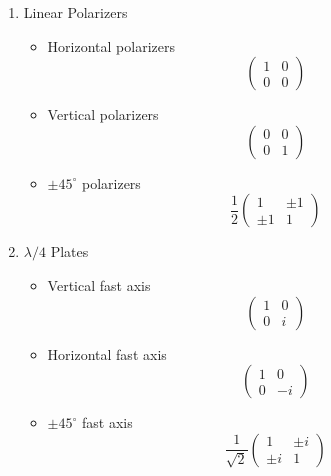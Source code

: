 \documentclass[../electromagnetism.tex]{subfiles}
\begin{document}
\begin{enumerate}
\item Linear Polarizers
	\begin{itemize}
	\item Horizontal polarizers
		\begin{equation}
			\begin{pmatrix}
				1&0\\0&0
			\end{pmatrix}
			\label{eq:horizontalpolarjones}
		\end{equation}
	\item Vertical polarizers
		\begin{equation}
			\begin{pmatrix}
				0&0\\0&1
			\end{pmatrix}
			\label{eq:verticalpolarjones}
		\end{equation}
	\item $\pm45^{\circ}$ polarizers
		\begin{equation}
			\frac{1}{2}\begin{pmatrix}
				1&\pm1\\\pm1&1
			\end{pmatrix}
			\label{eq:45polarjones}
		\end{equation}
	\end{itemize}
\item $\lambda/4$ Plates
	\begin{itemize}
	\item Vertical fast axis
		\begin{equation}
			\begin{pmatrix}
				1&0\\0&i
			\end{pmatrix}
			\label{eq:fastyjones}
		\end{equation}
	\item Horizontal fast axis
		\begin{equation}
			\begin{pmatrix}
				1&0\\0&-i
			\end{pmatrix}
			\label{eq:fastxjones}
		\end{equation}
	\item $\pm45^\circ$ fast axis
		\begin{equation}
			\frac{1}{\sqrt{2}}\begin{pmatrix}
				1&\pm i\\\pm i&1
			\end{pmatrix}

\end{equation}
\end{itemize}
\end{enumerate}
\end{document}

